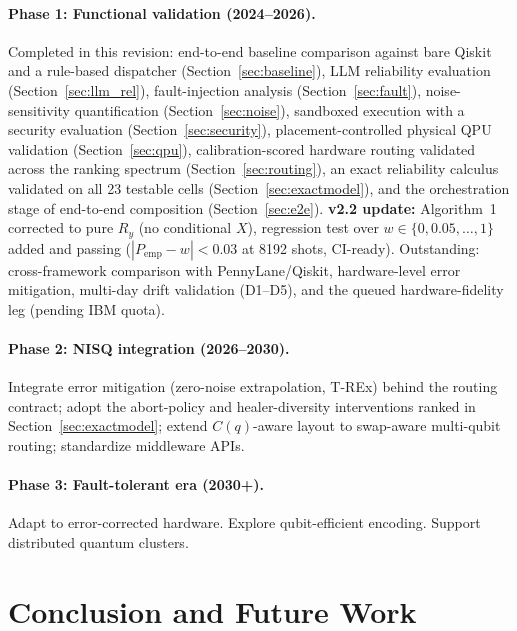 ﻿\documentclass[12pt,a4paper]{article}
\begin{document}
\paragraph{Phase 1: Functional validation (2024--2026).} Completed in this revision: end-to-end baseline comparison against bare Qiskit and a rule-based dispatcher (Section~\ref{sec:baseline}), LLM reliability evaluation (Section~\ref{sec:llm_rel}), fault-injection analysis (Section~\ref{sec:fault}), noise-sensitivity quantification (Section~\ref{sec:noise}), sandboxed execution with a security evaluation (Section~\ref{sec:security}), placement-controlled physical QPU validation (Section~\ref{sec:qpu}), calibration-scored hardware routing validated across the ranking spectrum (Section~\ref{sec:routing}), an exact reliability calculus validated on all 23 testable cells (Section~\ref{sec:exactmodel}), and the orchestration stage of end-to-end composition (Section~\ref{sec:e2e}). \textbf{v2.2 update:} Algorithm~1 corrected to pure $R_y$ (no conditional $X$), regression test over $w\in\{0,0.05,\ldots,1\}$ added and passing ($|P_{\mathrm{emp}}-w|<0.03$ at 8192 shots, CI-ready). Outstanding: cross-framework comparison with PennyLane/Qiskit, hardware-level error mitigation, multi-day drift validation (D1--D5), and the queued hardware-fidelity leg (pending IBM quota).

\paragraph{Phase 2: NISQ integration (2026--2030).} Integrate error mitigation (zero-noise extrapolation, T-REx) behind the routing contract; adopt the abort-policy and healer-diversity interventions ranked in Section~\ref{sec:exactmodel}; extend $C(q)$-aware layout to swap-aware multi-qubit routing; standardize middleware APIs.

\paragraph{Phase 3: Fault-tolerant era (2030+).} Adapt to error-corrected hardware. Explore qubit-efficient encoding. Support distributed quantum clusters.


\section{Conclusion and Future Work}\label{sec:conclusion}
\end{document}
